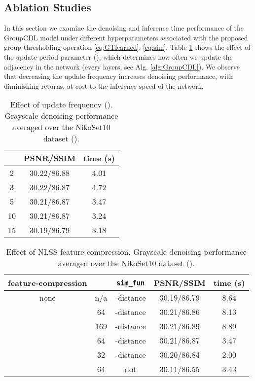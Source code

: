 \documentclass[lettersize,journal]{IEEEtran}
\begin{document}
\subsection{Ablation Studies} \label{sec:ablation}
In this section we examine the denoising and inference time performance of the
GroupCDL model under different hyperparameters associated with the proposed
group-thresholding operation \eqref{eq:GTlearned}, \eqref{eq:sim}. Table
\ref{tab:ablation:update} shows the effect of the update-period parameter
(), which determines how often we update the adjacency 
in the network (every  layers, see Alg. \ref{alg:GroupCDL}). We observe that decreasing the update
frequency increases denoising performance, with diminishing returns, at cost to
the inference speed of the network.
\begin{table}[ht]
    \centering
    \caption{Effect of update frequency (). Grayscale denoising performance
    averaged over the NikoSet10 dataset ().}
    \begin{tabular}{c|cc}
        \hline
         & PSNR/SSIM & time (s)\\
        \hline
        2 & 30.22/86.88 & 4.01 \\
        3 & 30.22/86.87 & 4.72 \\
        5 & 30.21/86.87 & 3.47 \\
        10 & 30.21/86.87 & 3.24 \\
        15 & 30.19/86.79 & 3.18 \\
        \hline
    \end{tabular}
    \label{tab:ablation:update}
\end{table}
\begin{table}[ht]
    \centering
    \caption{Effect of NLSS feature compression. Grayscale denoising performance
    averaged over the NikoSet10 dataset ().}
    \begin{tabular}{ccc|cc}
        \hline
        feature-compression &  & \texttt{sim\_fun} & PSNR/SSIM & time (s) \\
        \hline
        none & n/a & -distance & 30.19/86.79 & 8.64 \\
         & 64 & -distance & 30.21/86.86 & 8.13 \\
         & 169 & -distance & 30.21/86.89 & 8.89 \\
         & 64 & -distance & 30.21/86.87 & 3.47 \\
         & 32 & -distance & 30.20/86.84 & 2.00 \\
         & 64 & dot & 30.11/86.55 & 3.43 \\
        \hline
    \end{tabular}
    \label{tab:ablation:nlss}
\end{table}
\end{document}
